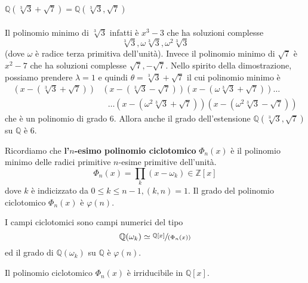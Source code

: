 \begin{esempio}
	$\mathbb{Q}(\sqrt[3]{3}+\sqrt{7})=\mathbb{Q}(\sqrt[3]{3},\sqrt{7})$ \\ \\ 
	Il polinomio minimo di $\sqrt[3]{3}$ infatti è $x^3-3$ che ha soluzioni complesse 
	\begin{equation*}
	\sqrt[3]{3}, \omega \sqrt[3]{3}, \omega^2 \sqrt[3]{3}
	\end{equation*}
	(dove $\omega$ è radice terza primitiva dell'unità). Invece il polinomio minimo di $\sqrt{7}$ è $x^2-7$ che ha soluzioni complesse $\sqrt{7}, -\sqrt{7}$. Nello spirito della dimostrazione, possiamo prendere $\lambda=1$ e quindi $\theta=\sqrt[3]{3}+\sqrt{7}$ il cui polinomio minimo è
	\begin{align*}
	\left(x-(\sqrt[3]{3}+\sqrt{7})\right)&\left(x-(\sqrt[3]{3}-\sqrt{7})\right)\left(x-(\omega\sqrt[3]{3}+\sqrt{7})\right)\dots\\
	&\ \ \ \dots \left(x-(\omega^2\sqrt[3]{3}+\sqrt{7})\right)\left(x-(\omega^2\sqrt[3]{3}-\sqrt{7})\right)
	\end{align*}
	che è un polinomio di grado 6. Allora anche il grado dell'estensione $\mathbb{Q}(\sqrt[3]{3},\sqrt{7})$ su $\mathbb{Q}$ è 6.
\end{esempio}
\begin{definizione}
	Ricordiamo che \textbf{l'$n$-esimo polinomio ciclotomico} $\Phi_n(x)$ è il polinomio minimo delle radici primitive $n$-esime primitive dell'unità.
	\begin{equation*}
	\Phi_n(x)=\prod_{k}(x-\omega_k)\in\mathbb{Z}[x]
	\end{equation*}
	dove $k$ è indicizzato da $0\leq k\leq n-1, (k,n)=1$. Il grado del polinomio ciclotomico $\Phi_n(x)$ è $\varphi(n)$.
\end{definizione}
\begin{definizione}
	I campi ciclotomici sono campi numerici del tipo
	\begin{equation*}
	\mathbb{Q}(\omega_k)\simeq\sfrac{\mathbb{Q}[x]}{(\Phi_n(x))}
	\end{equation*}
	ed il grado di $\mathbb{Q}(\omega_k)$ su $\mathbb{Q}$ è $\varphi(n)$.
\end{definizione}
\begin{teorema}
	Il polinomio ciclotomico $\Phi_n(x)$ è irriducibile in $\mathbb{Q}[x]$.
\end{teorema}
